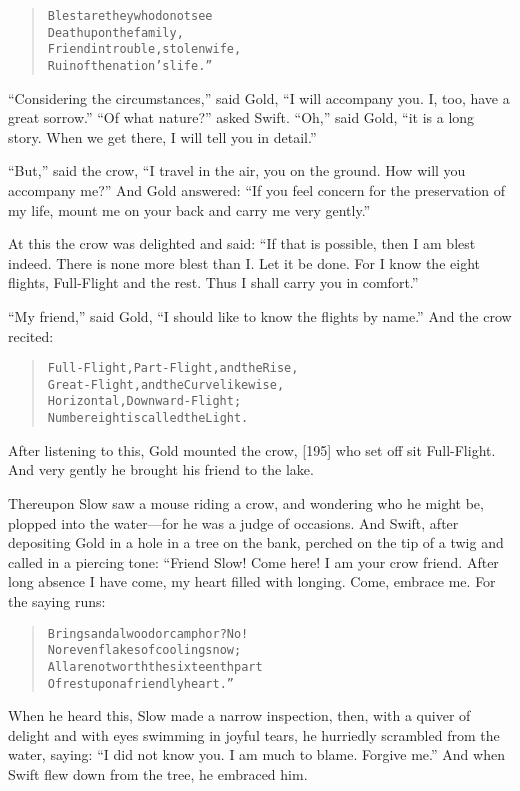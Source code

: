 \documentclass[article, twoside, 14pt]{memoir}
\renewenvironment{verbatim}{%
\begin{quote}%
\vskip -10pt%
\begin{alltt}\normalfont\large}{\end{alltt}%
\end{quote}%
\vskip -10pt
} %
\begin{document}
\begin{verbatim}
Blest are they who do not see
Death upon the family,
Friend in trouble, stolen wife,
Ruin of the nation's life.”
\end{verbatim}
``Considering the circumstances,'' said Gold,
``I will accompany you. I, too, have a great sorrow.''
``Of what nature?'' asked Swift. ``Oh,'' said Gold,
``it is a long story. When we get there, I will tell you in detail.''

``But,'' said the crow,
``I travel in the air, you on the ground. How will you accompany me?''
And Gold answered:
``If you feel concern for the preservation of my life, mount me on your back and carry me very gently.''

At this the crow was delighted and said:
``If that is possible, then I am blest indeed. There is none more blest than I. Let it be done. For I know the eight flights, Full-Flight and the rest. Thus I shall carry you in comfort.''

``My friend,'' said Gold,
``I should like to know the flights by name.'' And the crow
recited:

\begin{verbatim}
Full-Flight, Part-Flight, and the Rise,
Great-Flight, and the Curve likewise,
Horizontal, Downward-Flight;
Number eight is called the Light.
\end{verbatim}
After listening to this, Gold mounted the crow, [195] who set off
sit Full-Flight. And very gently he brought his friend to the
lake.

Thereupon Slow saw a mouse riding a crow, and wondering who he
might be, plopped into the water---for he was a judge of occasions.
And Swift, after depositing Gold in a hole in a tree on the bank,
perched on the tip of a twig and called in a piercing tone: “Friend
Slow! Come here! I am your crow friend. After long absence I have
come, my heart filled with longing. Come, embrace me. For the
saying runs:

\begin{verbatim}
Bring sandalwood or camphor? No!
Nor even flakes of cooling snow;
All are not worth the sixteenth part
Of rest upon a friendly heart.”
\end{verbatim}
When he heard this, Slow made a narrow inspection, then, with a
quiver of delight and with eyes swimming in joyful tears, he
hurriedly scrambled from the water, saying:
``I did not know you. I am much to blame. Forgive me.'' And when
Swift flew down from the tree, he embraced him.
\end{document}
